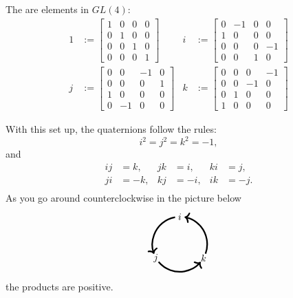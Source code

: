 \documentclass{ximera}
\begin{document}
\begin{definition}
  The  are elements in $GL(4)$:
  \begin{align*}
    1 &:=
    \begin{bmatrix}
      1 & 0 & 0 & 0 \\
      0 & 1 & 0 & 0 \\
      0 & 0 & 1 & 0 \\
      0 & 0 & 0 & 1
    \end{bmatrix}
    &
    i &:=
    \begin{bmatrix}
      0 & -1 & 0 &  0 \\
      1 &  0 & 0 &  0 \\
      0 &  0 & 0 & -1 \\
      0 &  0 & 1 &  0
    \end{bmatrix} \\
    j &:=
    \begin{bmatrix}
      0 &  0 & -1 &  0 \\
      0 &  0 &  0 &  1 \\
      1 &  0 &  0 &  0 \\
      0 & -1 &  0 &  0 
    \end{bmatrix}
    &
    k &:=
    \begin{bmatrix}
      0 &  0 &  0 & -1 \\
      0 &  0 & -1 &  0 \\
      0 &  1 &  0 &  0 \\
      1 &  0 &  0 &  0 
    \end{bmatrix}
  \end{align*}
\end{definition}

  With this set up, the quaternions follow the rules:
  \[
  i^2 = j^2 = k^2 = -1,
  \]
and
\begin{align*}
  ij &= k,  & jk &= i, & ki &= j, \\
  ji &= -k, & kj &= -i, & ik &= -j. \\
\end{align*}
As you go around counterclockwise in the picture below
\[
\begin{tikzpicture}
  \draw[ultra thick,->] (.94,-.34) arc (-20:80:1cm);
  \draw[ultra thick,->] (-.17,.98) arc (100:200:1cm);
  \draw[ultra thick,->] (-.77,-.64) arc (220:320:1cm);
  \node at (0,1) {$i$};
  \node at (-.87,-.5) {$j$};
  \node at (.87,-.5) {$k$};
\end{tikzpicture}
\]
the products are positive.
\end{document}
